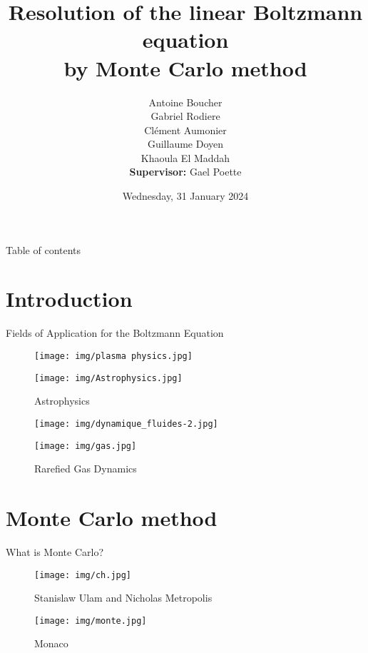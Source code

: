 \documentclass[aspectratio=1610]{beamer}
\title{Resolution of the linear Boltzmann equation\\ by Monte Carlo method}
\subtitle{}
\author{
	Antoine Boucher\\
	Gabriel Rodiere\\
	Clément Aumonier\\
	Guillaume Doyen\\
	Khaoula El Maddah\\
	\vspace{1em}
	\textbf{Supervisor:} Gael Poette
}
\institute{}
\date{Wednesday, 31\up{st} January 2024}
\begin{document}
\begin{frame}[plain]
  \titlepage
\end{frame}

\begin{frame}{Table of contents}
  \tableofcontents
\end{frame}

\section{Introduction}
\begin{frame}{Fields of Application for the Boltzmann Equation}

\begin{multicols}{2}
    \begin{figure}
      \centering
      \texttt{[image: img/plasma physics.jpg]}
      \caption *{Plasma physics}
      
      \texttt{[image: img/Astrophysics.jpg]}
      \caption*{Astrophysics}
    \end{figure}

    \begin{figure}
      \centering
      \texttt{[image: img/dynamique\_fluides-2.jpg]}
      \caption *{Fluid dynamic}
      
      \texttt{[image: img/gas.jpg]}
      \caption*{Rarefied Gas Dynamics}
    \end{figure}
\end{multicols}

\end{frame}

\section{Monte Carlo method}
\begin{frame}{What is Monte Carlo?}
  \begin{figure}
    \begin{minipage}{0.48\textwidth}
      \centering
      \texttt{[image: img/ch.jpg]}
      \caption*{Stanislaw Ulam and Nicholas Metropolis}
      \label{fig:persons}
    \end{minipage}\hfill
    \begin{minipage}{0.48\textwidth}
      \centering
      \texttt{[image: img/monte.jpg]}
      \caption*{Monaco}
      \label{fig:monte}
    \end{minipage}
  \end{figure}
\end{frame}
\end{document}
